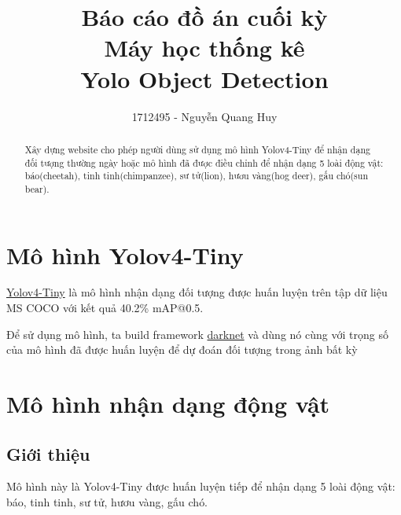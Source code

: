 \documentclass[20pt, a4paper]{article}
\begin{document}
\title{Báo cáo đồ án cuối kỳ \\
Máy học thống kê\\
Yolo Object Detection}
\author{1712495 - Nguyễn Quang Huy}
\maketitle

\renewcommand{\abstractname}{Tóm tắt}
\begin{abstract}
	Xây dựng website cho phép người dùng sử dụng mô hình Yolov4-Tiny để nhận dạng đối tượng thường ngày 
	hoặc mô hình đã được điều chỉnh để nhận dạng 5 loài động vật: báo(cheetah), tinh tinh(chimpanzee), sư tử(lion), hươu vàng(hog deer), gấu chó(sun bear). 
\end{abstract}

\renewcommand{\contentsname}{Mục lục}
\tableofcontents

\section{Mô hình Yolov4-Tiny}

\href{https://github.com/AlexeyAB/darknet#pre-trained-models}{Yolov4-Tiny} 
là mô hình nhận dạng đối tượng được huấn luyện trên tập dữ liệu MS COCO với kết quả 40.2\% mAP@0.5.

Để sử dụng mô hình, ta build framework \href{https://github.com/AlexeyAB/darknet}{darknet} và dùng nó cùng với trọng số của mô hình đã được huấn luyện để dự đoán đối tượng trong ảnh bất kỳ

\section{Mô hình nhận dạng động vật}
\subsection{Giới thiệu}
Mô hình này là Yolov4-Tiny được huấn luyện tiếp để nhận dạng 5 loài động vật: báo, tinh tinh, sư tử, hươu vàng, gấu chó.
\end{document}
